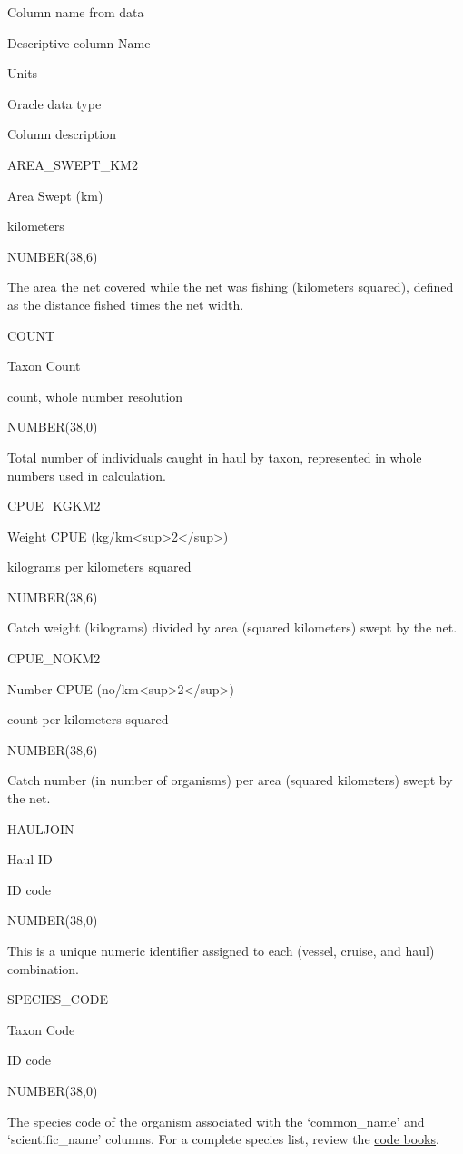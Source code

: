 \documentclass[
  letterpaper,
  oneside,
  open=any]{scrbook}
\begin{document}
Column name from data

Descriptive column Name

Units

Oracle data type

Column description

AREA\_SWEPT\_KM2

Area Swept (km)

kilometers

NUMBER(38,6)

The area the net covered while the net was fishing (kilometers squared),
defined as the distance fished times the net width.

COUNT

Taxon Count

count, whole number resolution

NUMBER(38,0)

Total number of individuals caught in haul by taxon, represented in
whole numbers used in calculation.

CPUE\_KGKM2

Weight CPUE (kg/km\textless sup\textgreater2\textless/sup\textgreater)

kilograms per kilometers squared

NUMBER(38,6)

Catch weight (kilograms) divided by area (squared kilometers) swept by
the net.

CPUE\_NOKM2

Number CPUE (no/km\textless sup\textgreater2\textless/sup\textgreater)

count per kilometers squared

NUMBER(38,6)

Catch number (in number of organisms) per area (squared kilometers)
swept by the net.

HAULJOIN

Haul ID

ID code

NUMBER(38,0)

This is a unique numeric identifier assigned to each (vessel, cruise,
and haul) combination.

SPECIES\_CODE

Taxon Code

ID code

NUMBER(38,0)

The species code of the organism associated with the `common\_name' and
`scientific\_name' columns. For a complete species list, review the
\href{https://www.fisheries.noaa.gov/resource/document/groundfish-survey-species-code-manual-and-data-codes-manual}{code
books}.
\end{document}

